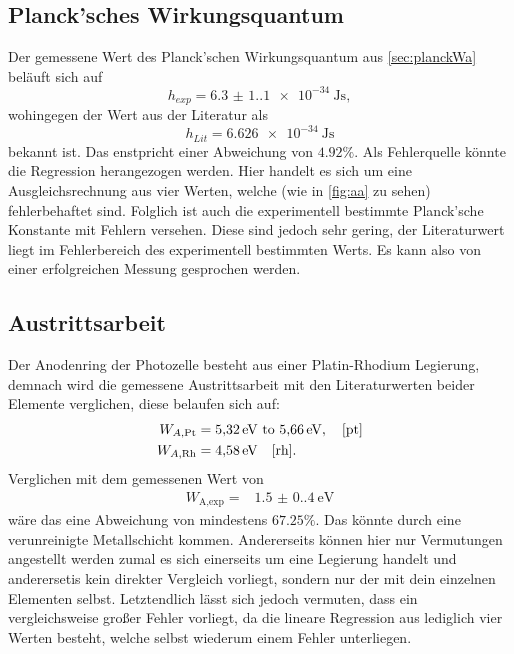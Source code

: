 \subsection{Planck'sches Wirkungsquantum}
Der gemessene Wert des Planck'schen Wirkungsquantum aus \autoref{sec:planckWa}
beläuft sich auf
\begin{equation*}
    h_{exp} = \qty{6.3(1.1)e-34}{\joule\second},
\end{equation*}
\noindent wohingegen der Wert aus der Literatur als 
\begin{equation*}
    h_{Lit} = \SI{6.626e-34}{\joule\second}
\end{equation*}
bekannt ist. Das enstpricht einer Abweichung von $4.92 \%$. Als Fehlerquelle
könnte die Regression herangezogen werden. Hier handelt es sich um eine
Ausgleichsrechnung aus vier Werten, welche (wie in \autoref{fig:aa} zu sehen)
fehlerbehaftet sind. Folglich ist auch die experimentell bestimmte Planck'sche 
Konstante mit Fehlern versehen. Diese sind jedoch sehr gering, der Literaturwert
liegt im Fehlerbereich des experimentell bestimmten Werts. Es kann also von
einer erfolgreichen Messung gesprochen werden.

\subsection{Austrittsarbeit}
Der Anodenring der Photozelle besteht aus einer Platin-Rhodium Legierung, 
demnach wird die gemessene Austrittsarbeit mit den Literaturwerten beider 
Elemente verglichen, diese belaufen sich auf:
\begin{align*}
    W_{A,\text{Pt}} &= \SIrange{5.32}{5.66}{\eV}, \quad \text{\cite{pt}} \\
    W_{A,\text{Rh}} &= \SI{4.58}{\eV} \quad \text{\cite{rh}}.
\end{align*}
Verglichen mit dem gemessenen Wert von 
\begin{align*}
    W_\text{A,exp} =& \qty{1.5(0.4)}{\eV}
\end{align*}
wäre das eine Abweichung von mindestens $67.25 \%$. Das könnte durch eine 
verunreinigte Metallschicht kommen. Andererseits können hier nur Vermutungen 
angestellt werden zumal es sich einerseits um eine Legierung handelt und 
anderersetis kein direkter Vergleich vorliegt, sondern nur der mit dein einzelnen 
Elementen selbst. Letztendlich lässt sich jedoch vermuten, dass ein vergleichsweise 
großer Fehler vorliegt, da die lineare Regression aus lediglich vier Werten 
besteht, welche selbst wiederum einem Fehler unterliegen.